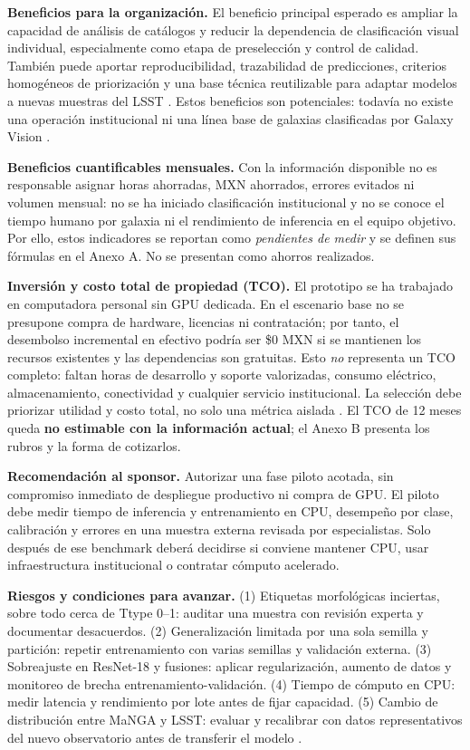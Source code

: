 \documentclass[letterpaper,11pt]{article}
\begin{document}
\textbf{Beneficios para la organización.} El beneficio principal esperado es ampliar la capacidad de análisis de catálogos y reducir la dependencia de clasificación visual individual, especialmente como etapa de preselección y control de calidad. También puede aportar reproducibilidad, trazabilidad de predicciones, criterios homogéneos de priorización y una base técnica reutilizable para adaptar modelos a nuevas muestras del LSST \parencite{galaxyproject}. Estos beneficios son potenciales: todavía no existe una operación institucional ni una línea base de galaxias clasificadas por Galaxy Vision \parencite{galaxyablacion}.\par
\textbf{Beneficios cuantificables mensuales.} Con la información disponible no es responsable asignar horas ahorradas, MXN ahorrados, errores evitados ni volumen mensual: no se ha iniciado clasificación institucional y no se conoce el tiempo humano por galaxia ni el rendimiento de inferencia en el equipo objetivo. Por ello, estos indicadores se reportan como \emph{pendientes de medir} y se definen sus fórmulas en el Anexo A. No se presentan como ahorros realizados.\par
\textbf{Inversión y costo total de propiedad (TCO).} El prototipo se ha trabajado en computadora personal sin GPU dedicada. En el escenario base no se presupone compra de hardware, licencias ni contratación; por tanto, el desembolso incremental en efectivo podría ser \$0 MXN si se mantienen los recursos existentes y las dependencias son gratuitas. Esto \emph{no} representa un TCO completo: faltan horas de desarrollo y soporte valorizadas, consumo eléctrico, almacenamiento, conectividad y cualquier servicio institucional. La selección debe priorizar utilidad y costo total, no solo una métrica aislada \parencite{baccarin2020}. El TCO de 12 meses queda \textbf{no estimable con la información actual}; el Anexo B presenta los rubros y la forma de cotizarlos.\par
\textbf{Recomendación al sponsor.} Autorizar una fase piloto acotada, sin compromiso inmediato de despliegue productivo ni compra de GPU. El piloto debe medir tiempo de inferencia y entrenamiento en CPU, desempeño por clase, calibración y errores en una muestra externa revisada por especialistas. Solo después de ese benchmark deberá decidirse si conviene mantener CPU, usar infraestructura institucional o contratar cómputo acelerado.\par
\textbf{Riesgos y condiciones para avanzar.} (1) Etiquetas morfológicas inciertas, sobre todo cerca de Ttype 0–1: auditar una muestra con revisión experta y documentar desacuerdos. (2) Generalización limitada por una sola semilla y partición: repetir entrenamiento con varias semillas y validación externa. (3) Sobreajuste en ResNet-18 y fusiones: aplicar regularización, aumento de datos y monitoreo de brecha entrenamiento-validación. (4) Tiempo de cómputo en CPU: medir latencia y rendimiento por lote antes de fijar capacidad. (5) Cambio de distribución entre MaNGA y LSST: evaluar y recalibrar con datos representativos del nuevo observatorio antes de transferir el modelo \parencite{babic2021}.\par
\end{document}
